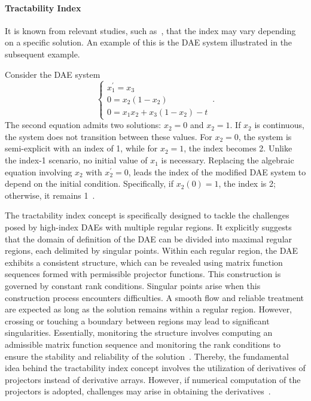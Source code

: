 \paragraph{Tractability Index}

It is known from relevant studies, such as~\cite{lamour2013differential}, that the index may vary depending on a specific solution. An example of this is the \ac{DAE} system illustrated in the subsequent example.

\begin{example}
  Consider the \ac{DAE} system
  \begin{equation*}
    \begin{cases}
    x_1^{\prime} = x_3 \\
    0 = x_2(1 - x_2) \\
    0 = x_1x_2 + x_3(1 - x_2) - t
    \end{cases} \, \text{.}
  \end{equation*}
  The second equation admits two solutions: $x_2 = 0$ and $x_2 = 1$. If $x_2$ is continuous, the system does not transition between these values. For $x_2 = 0$, the system is semi-explicit with an index of 1, while for $x_2 = 1$, the index becomes 2. Unlike the index-1 scenario, no initial value of $x_1$ is necessary. Replacing the algebraic equation involving $x_2$ with $x_2^{\prime} = 0$, leads the index of the modified \ac{DAE} system to depend on the initial condition. Specifically, if $x_2(0) = 1$, the index is 2; otherwise, it remains 1~\cite[Section 3.3]{lamour2013differential}.
\end{example}

The tractability index concept is specifically designed to tackle the challenges posed by high-index \acp{DAE} with multiple regular regions. It explicitly suggests that the domain of definition of the \ac{DAE} can be divided into maximal regular regions, each delimited by singular points. Within each regular region, the \ac{DAE} exhibits a consistent structure, which can be revealed using matrix function sequences formed with permissible projector functions. This construction is governed by constant rank conditions. Singular points arise when this construction process encounters difficulties. A smooth flow and reliable treatment are expected as long as the solution remains within a regular region. However, crossing or touching a boundary between regions may lead to significant singularities. Essentially, monitoring the structure involves computing an admissible matrix function sequence and monitoring the rank conditions to ensure the stability and reliability of the solution~\cite{lamour2011computational}. Thereby, the fundamental idea behind the tractability index concept involves the utilization of derivatives of projectors instead of derivative arrays. However, if numerical computation of the projectors is adopted, challenges may arise in obtaining the derivatives~\cite{mehrmann2015index}.

